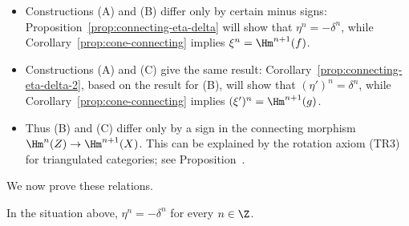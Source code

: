 \begin{itemize}
	\item Constructions (A) and (B) differ only by certain minus signs:
	Proposition~\ref{prop:connecting-eta-delta} will show that
	$\eta^n=-\delta^n$, while Corollary~\ref{prop:cone-connecting} implies
	$\xi^n=\Hm^{n+1}(f)$.
	\item Constructions (A) and (C) give the same result:
	Corollary~\ref{prop:connecting-eta-delta-2}, based on the result for (B),
	will show that $(\eta')^n=\delta^n$, while
	Corollary~\ref{prop:cone-connecting} implies
	$(\xi')^n=\Hm^{n+1}(g)$.
	\item Thus (B) and (C) differ only by a sign in the connecting morphism
	$\Hm^n(Z)\to\Hm^{n+1}(X)$. This can be explained by the rotation axiom
	(TR3) for triangulated categories; see
	Proposition~.
\end{itemize}

We now prove these relations.

\begin{proposition}\label{prop:connecting-eta-delta}
	In the situation above, $\eta^n=-\delta^n$ for every $n\in\Z$.
\end{proposition}

